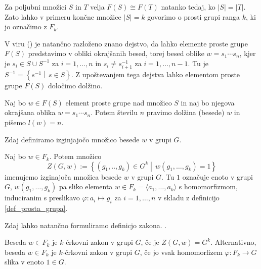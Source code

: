 \documentclass[mat1, tisk]{fmfdelo}
\numberwithin{equation}{section}  %
\begin{document}
\begin{opomba}
Za poljubni množici $S$ in $T$ velja $F(S) \cong F(T)$ natanko tedaj, ko $\lvert S \rvert = \lvert T \rvert$. Zato lahko v primeru končne množice $\lvert S \rvert = k$ govorimo o 
prosti grupi ranga $k$, ki jo označimo z $F_k$.
\end{opomba}

\noindent
V viru (\cite[str.~4, tridtev 1.9]{Lyndon_Schupp_2015}) je natančno razloženo znano dejstvo, da lahko elemente proste grupe $F(S)$ predstavimo v obliki okrajšanih besed,
torej besed oblike $w = s_1 \cdots s_n$, kjer je $s_i \in S \cup S^{-1}$ za $i = 1, \ldots, n$ in $s_i \neq s_{i+1}^{-1}$ za $i = 1, \ldots, n-1$. Tu je $S^{-1} = \left\{ s^{-1}  \middle|\, s \in  S \right\}$.
Z upoštevanjem tega dejstva lahko elementom proste grupe $F(S)$ določimo dolžino.

\begin{definicija}
\label{def_dolzina_besede}
Naj bo $w \in  F(S)$ element proste grupe nad množico $S$ in naj bo njegova okrajšana oblika $w = s_1 \cdots s_n$. Potem številu $n$ pravimo dolžina (besede) $w$ in pišemo $l(w) = n$.
\end{definicija}

\noindent
Zdaj definiramo izginjajočo množico besede $w$ v grupi $G$.

\begin{definicija}
\label{def_izginjajoca_mnozica}
Naj bo $w \in  F_k$. Potem množico \begin{equation*}
Z(G, w) := \left\{ (g_1, .., g_{k}) \in  G^{k}  \middle|\, w(g_1, \ldots, g_{k}) = 1 \right\} 
\end{equation*}  
imenujemo izginajoča množica besede $w$ v grupi $G$. Tu $1$ označuje enoto v grupi $G$, $w(g_1, \ldots, g_{k})$ pa sliko elementa $w \in F_k = \langle a_{1}, \ldots , a_k \rangle$ s homomorfizmom,
induciranim s preslikavo $\varphi: a_{i} \mapsto g_{i}$ za $i = 1,\ldots, n$ v skladu z definicijo \ref{def_prosta_grupa}.  
\end{definicija}

\indent
Zdaj lahko natančno formuliramo definicjo zakona. .

\begin{definicija}\label{def_zakon_formalna}
Beseda $w \in F_k$ je $k$-črkovni zakon v grupi $G$, če je $Z(G, w) = G^{k}$. Alternativno, beseda $w \in F_k$ je $k$-črkovni zakon v grupi $G$, če jo vsak homomorfizem $\varphi: F_k \to G$ slika v enoto $1 \in G$.   
\end{definicija}
\end{document}
